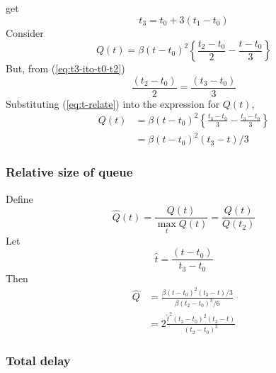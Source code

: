 \documentclass[12pt]{report}
\begin{document}
get
\begin{equation}
  \label{eq:t3-ito-t1-t0}
  t_3 = t_0 + 3(t_1-t_0)
\end{equation}
Consider
\begin{equation*}
  Q(t) = \beta(t-t_0)^2\left\{\frac{t_2-t_0}{2}-\frac{t-t_0}{3}\right\}
\end{equation*}
But, from (\ref{eq:t3-ito-t0-t2})
\begin{equation}
  \label{eq:t-relate}
  \frac{(t_2-t_0)}{2} = \frac{(t_3-t_0)}{3}
\end{equation}
Substituting (\ref{eq:t-relate}) into the expression for $Q(t)$,
\begin{equation}
  \label{eq:qt-ito-t3-t0}
  \begin{split}
    Q(t)&=\beta(t-t_0)^2\left\{\frac{t_3-t_0}{3}-\frac{t_3-t_0}{3}\right\}\\
    &=\beta(t-t_0)^2(t_3-t)/3
  \end{split}
\end{equation}

\subsubsection*{Relative size of queue}
\label{sec:rel-size-queue}

Define
\begin{equation}
  \label{eq:qhat-def}
  \hat{Q}(t) = \frac{Q(t)}{\max\limits_t Q(t)} = \frac{Q(t)}{Q(t_2)}
\end{equation}
Let
\begin{equation}
  \label{eq:t-hat-def}
  \hat{t}=\frac{(t-t_0)}{t_3-t_0}
\end{equation}
Then
\begin{equation}
  \label{eq:qhat-final}
  \begin{split}
  \hat{Q} & =\frac{\beta(t-t_0)^2(t_3-t)/3}{\beta(t_2-t_0)^3/6}\\
  &= 2\frac{\hat{t}^2(t_3-t_0)^2(t_3-t)}{(t_2-t_0)^3}
  \end{split}
\end{equation}

\subsubsection*{Total delay}
\label{sec:total-delay}
\end{document}
